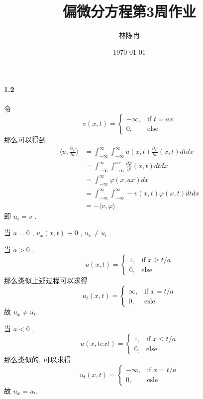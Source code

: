 \documentclass[a4paper, UTF8]{ctexart}				%
\title{偏微分方程第3周作业}
\author{林陈冉}
\date{\today}
\begin{document}
    \maketitle										%
    \paragraph{1.2}\quad
        令 
        $$
            v(x,t) = 
            \begin{cases}
                -\infty, &\text{if }t=ax\\
                0, &\text{else}
            \end{cases}
        $$
        那么可以得到
        \[
            \begin{split}
                \langle{u},{\frac{\partial \varphi}{\partial t}}\rangle
                & = \int^{\infty}_{-\infty} \int^{\infty}_{-\infty} u(x, t)\frac{\partial \varphi}{\partial t}(x,t)dt dx\\
                & = \int^{\infty}_{-\infty} \int^{ax}_{-\infty} \frac{\partial \varphi}{\partial t}(x,t)dt dx\\
                & = \int^{\infty}_{-\infty} \varphi(x,ax)dx\\
                & =  \int^{\infty}_{-\infty} \int^{\infty}_{-\infty} -v(x, t)\varphi(x,t)dt dx\\
                & = -\langle{v},{\varphi}\rangle
            \end{split}
        \]
        即 $u_t = v$ .

        当 $a = 0$ , $u_x(x,t) \equiv 0$ , $u_x \neq u_t$ .

        当 $a > 0$ , 
        \[
            u(x,t) =
            \begin{cases}
                1, &\text{if }x \ge t/a\\
                0, &\text{else}
            \end{cases}
        \]
        那么类似上述过程可以求得 
        \[
            u_t(x, t) =
            \begin{cases}
                \infty, &\text{if }x = t/a\\
                0, &\text{esle}
            \end{cases}
        \]
        故 $u_x \neq u_t$.

        当 $a < 0$ , 
        \[
            u(x,text) =
            \begin{cases}
                1, &\text{if }x \le t/a\\
                0, &\text{else}
            \end{cases}
        \]
        那么类似的, 可以求得
        \[
            u_t(x, t) =
            \begin{cases}
                -\infty, &\text{if }x = t/a\\
                0, &\text{esle}
            \end{cases}
        \]
        故 $u_x = u_t$.
\end{document}
